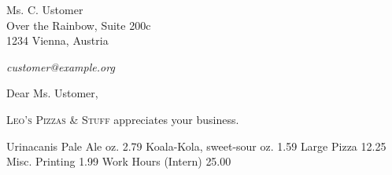 \documentclass[fontsize=11pt,parskip=full]{scrlttr2}
\begin{document}
	\def\payperiod		{14}	%
					\def\invoicenumber	{42}	%
	\begin{letter}{%
%
					Ms. C. Ustomer\\
					Over the Rainbow, Suite 200c\\
					1234 Vienna, Austria\\				
					\vspace{.25em}\par		%
					 \hfill\emph{customer@example.org}
	}
		\opening{Dear Ms. Ustomer,}

		\textsc{Leo's Pizzas \& Stuff} appreciates your business.

		\begin{invoice}[N]				%
			\NumbersOff					%
			\SeparatorOff
			\UseDollar

\makeatletter
	\renewcommand*\@amount		{~}					%
	\renewcommand*\@description	{Description}		%
	\renewcommand*\@unitprice	{Unit price}		%
	\renewcommand*\@totalprice	{Total price}		%
	\renewcommand*\@decimalsep	{.}					%

	\renewcommand*\@taxabrv		{Combined Sales Tax}
	\renewcommand*\@sumnet		{Subtotal}	%
	\renewcommand*\@sumtot		{Total}	%
	\renewcommand*\@excl		{}	%

\makeatother
	{Urinacanis Pale Ale		 oz.}	{2.79}
	{Koala-Kola, sweet-sour 	 oz.}	{1.59}
		{Large Pizza}								{12.25}
	{Misc. Printing}							{1.99}
	{Work Hours (Intern)}						{25.00}

		\end{invoice}




\end{letter}
\end{document}
